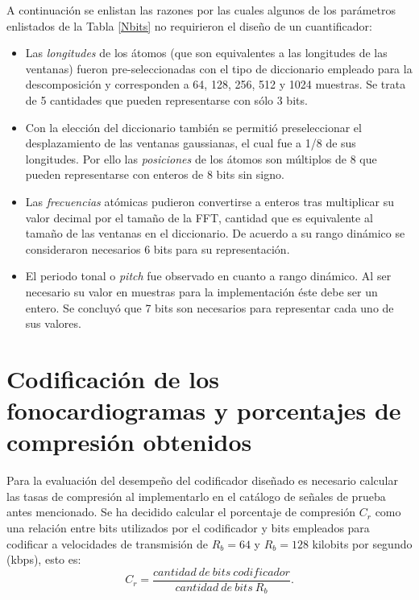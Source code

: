 A continuación se enlistan las razones por las cuales algunos de los parámetros enlistados de la Tabla \ref{Nbits} no requirieron el diseño de un cuantificador:
 \begin{itemize}
 	\item Las \emph{longitudes} de los átomos (que son equivalentes a las longitudes de las ventanas) fueron pre-seleccionadas con el tipo de 			diccionario empleado para la descomposición y corresponden a 64, 128, 256, 512 y 1024 muestras. Se trata de 5 cantidades que pueden 		representarse con sólo 3 bits.
	\item Con la elección del diccionario también se permitió preseleccionar el desplazamiento de las ventanas gaussianas, el cual fue a 1/8 de 			sus longitudes. Por ello las \emph{posiciones} de los átomos son múltiplos de 8 que pueden representarse con enteros de 8 bits sin 			signo.
	\item  Las \emph{frecuencias} atómicas pudieron convertirse a enteros tras multiplicar su valor decimal por el tamaño de la FFT, cantidad que 			es equivalente al tamaño de las ventanas en el diccionario. De acuerdo a su rango dinámico se consideraron necesarios 6 bits para su 			representación. 
	\item El periodo tonal o \emph{pitch} fue observado en cuanto a rango dinámico. Al ser necesario su valor en muestras para la implementación 		éste debe ser un entero. Se concluyó que 7 bits son necesarios para representar cada uno de sus valores.
 \end{itemize}
 
 \section{Codificación de los fonocardiogramas y porcentajes de compresión obtenidos}
Para la evaluación del desempeño del codificador diseñado es necesario calcular las tasas de compresión al implementarlo en el catálogo de señales de prueba antes mencionado. Se ha decidido calcular el porcentaje de compresión $C_{r}$ como una relación entre bits utilizados por el codificador y bits empleados para codificar a velocidades de transmisión de $R_{b}=64$ y $R_{b}=128$ kilobits por segundo (kbps), esto es: $$ C_{r}= \frac{ cantidad~de~bits~codificador}{cantidad~de~bits~R_{b}}.$$

